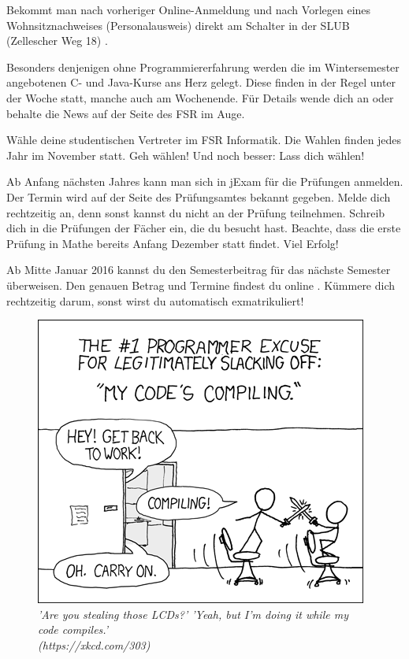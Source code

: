 \begin{itemize}[leftmargin=*]
\newpage

Bekommt man nach vorheriger Online-Anmeldung und nach Vorlegen eines Wohnsitznachweises (Personalausweis) direkt am Schalter in der SLUB (Zellescher Weg 18) .

Besonders denjenigen ohne Programmiererfahrung werden die im Wintersemester angebotenen C- und Java-Kurse ans Herz gelegt.
Diese finden in der Regel unter der Woche statt, manche auch am Wochenende.
Für Details wende dich an  oder behalte die News auf der Seite des FSR  im Auge.

Wähle deine studentischen Vertreter im FSR Informatik.
Die Wahlen finden jedes Jahr im November statt.
Geh wählen!
Und noch besser: Lass dich wählen!

Ab Anfang nächsten Jahres kann man sich in jExam für die Prüfungen anmelden. Der Termin wird auf der Seite des Prüfungsamtes bekannt gegeben. Melde dich rechtzeitig an, denn sonst kannst du nicht an der Prüfung teilnehmen.
Schreib dich in die Prüfungen der Fächer ein, die du besucht hast.
Beachte, dass die erste Prüfung in Mathe bereits Anfang Dezember statt findet.
Viel Erfolg!

Ab Mitte Januar 2016 kannst du den Semesterbeitrag für das nächste Semester überweisen. 
Den genauen Betrag und Termine findest du online .
Kümmere dich rechtzeitig darum, sonst wirst du automatisch exmatrikuliert!

\end{itemize}

\vfill

\begin{figure}[h!]
\centering
\includegraphics[scale=.4]{img/xkcd/compiling.png}
\caption*{{\small \textit{'Are you stealing those LCDs?' 'Yeah, but I'm doing it while my code compiles.'\\\hspace*{1mm}\hfill(https://xkcd.com/303)}}}
\end{figure}
